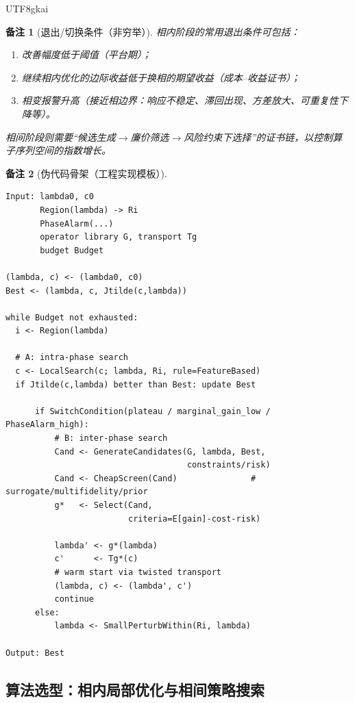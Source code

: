 \documentclass[12pt]{article}
\newtheorem{remark}{备注}[section]
\begin{document}
\begin{CJK*}{UTF8}{gkai}
\begin{remark}[退出/切换条件（非穷举）]
相内阶段的常用退出条件可包括：
\begin{enumerate}
  \item 改善幅度低于阈值（平台期）；
  \item 继续相内优化的边际收益低于换相的期望收益（成本--收益证书）；
  \item 相变报警升高（接近相边界：响应不稳定、滞回出现、方差放大、可重复性下降等）。
\end{enumerate}
相间阶段则需要“候选生成$\to$廉价筛选$\to$风险约束下选择”的证书链，以控制算子序列空间的指数增长。
\end{remark}

\begin{remark}[伪代码骨架（工程实现模板）]
\begin{verbatim}
Input: lambda0, c0
       Region(lambda) -> Ri
       PhaseAlarm(...)
       operator library G, transport Tg
       budget Budget

(lambda, c) <- (lambda0, c0)
Best <- (lambda, c, Jtilde(c,lambda))

while Budget not exhausted:
  i <- Region(lambda)

  # A: intra-phase search
  c <- LocalSearch(c; lambda, Ri, rule=FeatureBased)
  if Jtilde(c,lambda) better than Best: update Best

	  if SwitchCondition(plateau / marginal_gain_low / PhaseAlarm_high):
	      # B: inter-phase search
	      Cand <- GenerateCandidates(G, lambda, Best,
	                                 constraints/risk)
	      Cand <- CheapScreen(Cand)               # surrogate/multifidelity/prior
	      g*   <- Select(Cand,
	                     criteria=E[gain]-cost-risk)

	      lambda' <- g*(lambda)
	      c'      <- Tg*(c)
	      # warm start via twisted transport
	      (lambda, c) <- (lambda', c')
	      continue
	  else:
	      lambda <- SmallPerturbWithin(Ri, lambda)

Output: Best
\end{verbatim}
\end{remark}

\subsection{算法选型：相内局部优化与相间策略搜索}
\label{sec:twisted-search-algorithm-selection}


\end{CJK*}
\end{document}
